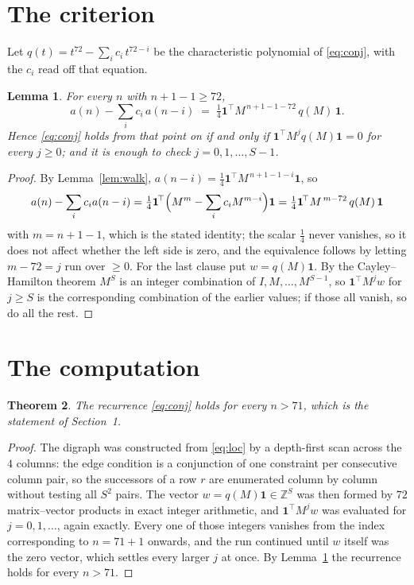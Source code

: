 \documentclass[11pt,a4paper]{article}
\theoremstyle{plain}
\newtheorem{theorem}{Theorem}
\newtheorem{lemma}[theorem]{Lemma}
\theoremstyle{definition}
\begin{document}
\section{The criterion}

Let $q(t)=t^{72}-\sum_i c_i\,t^{72-i}$ be the characteristic polynomial of
\eqref{eq:conj}, with the $c_i$ read off that equation.

\begin{lemma}\label{lem:crit}
For every $n$ with $n+1-1\ge72$,
\[
a(n)-\sum_i c_i\,a(n-i)\;=\;\tfrac1{4}\mathbf{1}^{\!\top}M^{\,n+1-1-72}\,q(M)\,\mathbf{1} .
\]
Hence \eqref{eq:conj} holds from that point on if and only if
$\mathbf{1}^{\!\top}M^{j}q(M)\mathbf{1}=0$ for every $j\ge0$; and it is enough to check
$j=0,1,\dots,S-1$.
\end{lemma}

\begin{proof}
By Lemma~\ref{lem:walk}, $a(n-i)=\tfrac1{4}\mathbf{1}^{\!\top}M^{\,n+1-1-i}\mathbf{1}$, so
\[
a(n)-\sum_i c_i a(n-i)
=\tfrac1{4}\mathbf{1}^{\!\top}\Bigl(M^{m}-\sum_i c_i M^{m-i}\Bigr)\mathbf{1}
=\tfrac1{4}\mathbf{1}^{\!\top}M^{\,m-72}\,q(M)\,\mathbf{1}
\]
with $m=n+1-1$, which is the stated identity; the scalar $\tfrac1{4}$ never vanishes, so it does not affect whether the left side is zero, and the equivalence follows by letting
$m-72=j$ run over $\ge0$. For the last clause put $w=q(M)\mathbf{1}$. By the
Cayley--Hamilton theorem $M^{S}$ is an integer combination of $I,M,\dots,M^{S-1}$, so
$\mathbf{1}^{\!\top}M^{j}w$ for $j\ge S$ is the corresponding combination of the earlier
values; if those all vanish, so do all the rest.
\end{proof}

\section{The computation}

\begin{theorem}
The recurrence \eqref{eq:conj} holds for every $n>71$, which is the statement of
Section~1.
\end{theorem}

\begin{proof}
The digraph was constructed from \eqref{eq:loc} by a depth-first scan across the $4$
columns: the edge condition is a conjunction of one constraint per consecutive column
pair, so the successors of a row $r$ are enumerated column by column without testing all
$S^2$ pairs. The vector $w=q(M)\mathbf{1}\in\mathbb{Z}^{S}$ was then formed by $72$
matrix--vector products in exact integer arithmetic, and $\mathbf{1}^{\!\top}M^{j}w$ was
evaluated for $j=0,1,\dots$, again exactly. Every one of those integers vanishes from the
index corresponding to $n=71+1$ onwards, and the run continued until $w$ itself was the
zero vector, which settles every larger $j$ at once. By Lemma~\ref{lem:crit} the recurrence
holds for every $n>71$.
\end{proof}
\end{document}
